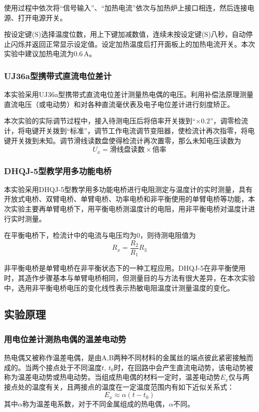 \documentclass[UTF8]{article}
\theoremstyle{MyLineTheoremStyle} %
\theoremstyle{MyBlockTheoremStyle} %
\theoremstyle{MySubsubsectionStyle} %
\begin{document}
使用过程中依次将“信号输入”、“加热电流”依次与加热炉上接口相连，然后连接电源、打开电源开关。

按设定键(S)选择温度位数，用上下键加减数值，连续未按设定键(S)八秒，自动停止闪烁并返回正常显示设定值。设定加热温度后打开面板上的加热电流开关。本次实验中建议加热电流为$ 0.6\,\mathrm A $。
\subsubsection{UJ36a型携带式直流电位差计}
本实验采用UJ36a型携带式直流电位差计测量热电偶的电压。利用补偿法原理测量直流电压（或电动势）和对各种直流毫伏表及电子电位差计进行刻度矫正。

本次实验的实际调节过程中，接入待测电压后将倍率开关拨到“$ \times 0.2 $”，调零检流计，将电键开关拨到“标准”，调节工作电流调节变阻器，使检流计再次指零，将电键开关拨到未知。调节滑线读数盘使得检流计再次置零，那么未知电压读数为
\begin{equation}
U_x=\text{滑线盘读数}\times\text{倍率}
\end{equation}
\subsubsection{DHQJ-5型教学用多功能电桥}
本实验采用DHQJ-5型教学用多功能电桥进行电阻测定与温度计的实时测量，具有开放式电桥、双臂电桥、单臂电桥、功率电桥和非平衡使用的单臂电桥等功能，本次实验主要再单臂电桥下，用平衡电桥测温度计的电阻，用非平衡电桥对温度计进行实时测量。

在平衡电桥下，检流计中的电流与电压均为0，则待测电阻值为
\begin{equation}
R_x=\frac{R_2}{R_1}R_3
\end{equation}

非平衡电桥是单臂电桥在非平衡状态下的一种工程应用。DHQJ-5在非平衡使用时，其造作步骤基本与单臂电桥相同，但测量目的与方法有很大差异，在本次实验中，选用非平衡电桥电压的变化线性表示热敏电阻温度计测量温度的变化。

\subsection{实验原理}
\subsubsection{用电位差计测热电偶的温差电动势}
热电偶又被称作温差电偶，是由A,B两种不同材料的金属丝的端点彼此紧密接触而成的。当两个接点处于不同温度$ t,\,t_0 $时，在回路中会产生直流电动势，该电动势被称为温差电动势或热电动势。当组成热电偶的材料一定时，温差电动势$ E_x $仅与两接点处的温度有关，且两接点的温度在一定温度范围内有如下近似关系式：
\begin{equation}
E_x\approx\alpha(t-t_0)
\end{equation}
其中$ \alpha $称为温差电系数，对于不同金属组成的热电偶，$ \alpha $不同。%
\end{document}

